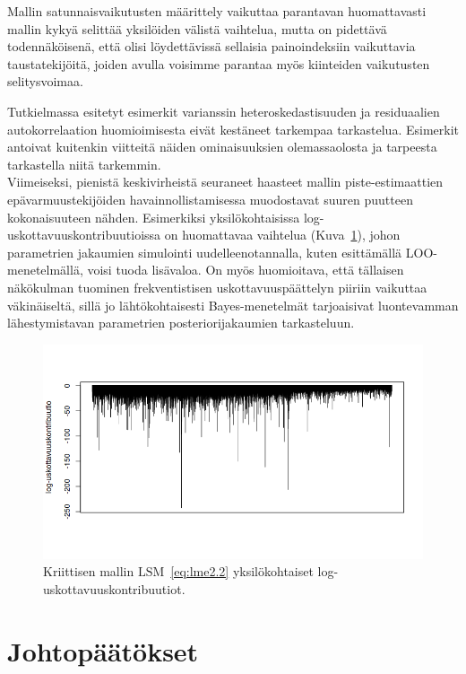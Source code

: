 \documentclass[finnish]{docopts}
\begin{document}
Mallin satunnaisvaikutusten määrittely vaikuttaa parantavan huomattavasti mallin kykyä selittää yksilöiden välistä vaihtelua, mutta on pidettävä todennäköisenä, että olisi löydettävissä sellaisia painoindeksiin vaikuttavia taustatekijöitä, joiden avulla voisimme parantaa myös kiinteiden vaikutusten selitysvoimaa.

Tutkielmassa esitetyt esimerkit varianssin heteroskedastisuuden ja residuaalien autokorrelaation huomioimisesta eivät kestäneet tarkempaa tarkastelua. Esimerkit antoivat kuitenkin viitteitä näiden ominaisuuksien olemassaolosta ja tarpeesta tarkastella niitä tarkemmin.\\

Viimeiseksi, pienistä keskivirheistä seuraneet haasteet mallin piste-estimaattien epävarmuustekijöiden havainnollistamisessa muodostavat suuren puutteen kokonaisuuteen nähden. Esimerkiksi yksilökohtaisissa log-uskottavuuskontribuutioissa on huomattavaa vaihtelua (Kuva~\ref{fig:logkontrib}), johon parametrien jakaumien simulointi uudelleenotannalla, kuten \cite{burzykowski13} esittämällä LOO-menetelmällä, voisi tuoda lisävaloa. On myös huomioitava, että tällaisen näkökulman tuominen frekventistisen uskottavuuspäättelyn piiriin vaikuttaa väkinäiseltä, sillä jo lähtökohtaisesti Bayes-menetelmät tarjoaisivat luontevamman lähestymistavan parametrien posteriorijakaumien tarkasteluun.\\

\begin{figure}[H]
\centering
  \includegraphics[scale=0.6]{kuvaajat/log.png}
  \caption{Kriittisen mallin $\text{LSM}$~\ref{eq:lme2.2} yksilökohtaiset log-uskottavuuskontribuutiot.}
  \label{fig:logkontrib}
\end{figure}

\section{Johtopäätökset}
\label{sec:johto}
\end{document}
